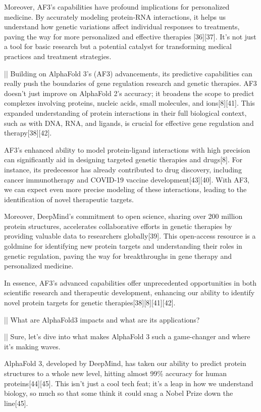 \begin{showcase}[title=Topic: AlphaFold 3]
Moreover, AF3's capabilities have profound implications for personalized medicine. By accurately modeling protein-RNA interactions, it helps us understand how genetic variations affect individual responses to treatments, paving the way for more personalized and effective therapies [36][37]. It's not just a tool for basic research but a potential catalyst for transforming medical practices and treatment strategies.

||
Building on AlphaFold 3's (AF3) advancements, its predictive capabilities can really push the boundaries of gene regulation research and genetic therapies. AF3 doesn't just improve on AlphaFold 2's accuracy; it broadens the scope to predict complexes involving proteins, nucleic acids, small molecules, and ions[8][41]. This expanded understanding of protein interactions in their full biological context, such as with DNA, RNA, and ligands, is crucial for effective gene regulation and therapy[38][42].

AF3's enhanced ability to model protein-ligand interactions with high precision can significantly aid in designing targeted genetic therapies and drugs[8]. For instance, its predecessor has already contributed to drug discovery, including cancer immunotherapy and COVID-19 vaccine development[43][40]. With AF3, we can expect even more precise modeling of these interactions, leading to the identification of novel therapeutic targets.

Moreover, DeepMind's commitment to open science, sharing over 200 million protein structures, accelerates collaborative efforts in genetic therapies by providing valuable data to researchers globally[39]. This open-access resource is a goldmine for identifying new protein targets and understanding their roles in genetic regulation, paving the way for breakthroughs in gene therapy and personalized medicine. 

In essence, AF3's advanced capabilities offer unprecedented opportunities in both scientific research and therapeutic development, enhancing our ability to identify novel protein targets for genetic therapies[38][8][41][42].

||
What are AlphaFold3 impacts and what are its applications?

||
Sure, let's dive into what makes AlphaFold 3 such a game-changer and where it's making waves.

AlphaFold 3, developed by DeepMind, has taken our ability to predict protein structures to a whole new level, hitting almost 99\% accuracy for human proteins[44][45]. This isn't just a cool tech feat; it's a leap in how we understand biology, so much so that some think it could snag a Nobel Prize down the line[45].


\end{showcase}
